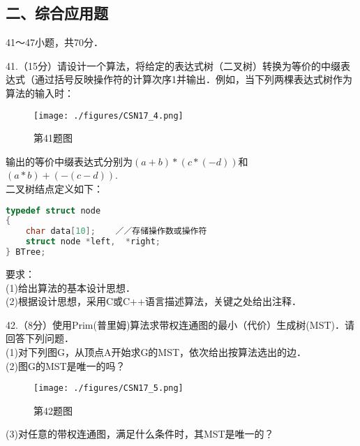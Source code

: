 \subsection{二、综合应用题}
41～47小题，共70分．

41.（15分）请设计一个算法，将给定的表达式树（二叉树）转换为等价的中缀表达式（通过括号反映操作符的计算次序1并输出．例如，当下列两棵表达式树作为算法的输入时：
\begin{figure}[ht]
\centering
\texttt{[image: ./figures/CSN17\_4.png]}
\caption{第41题图} \label{CSN17_fig4}
\end{figure}
输出的等价中缀表达式分别为$(a+b)*(c*(-d))$和$(a*b)+(-(c-d))$. \\
二叉树结点定义如下：
\begin{lstlisting}[language=cpp]
typedef struct node
{
    char data[10];    ／／存储操作数或操作符
    struct node *left,  *right;
} BTree;
\end{lstlisting}
要求： \\
(1)给出算法的基本设计思想． \\
(2)根据设计思想，采用C或C++语言描述算法，关键之处给出注释．

42.（8分）使用Prim(普里姆)算法求带权连通图的最小（代价）生成树(MST)．请回答下列问题． \\
(1)对下列图G，从顶点A开始求G的MST，依次给出按算法选出的边． \\
(2)图G的MST是唯一的吗？
\begin{figure}[ht]
\centering
\texttt{[image: ./figures/CSN17\_5.png]}
\caption{第42题图} \label{CSN17_fig5}
\end{figure}
(3)对任意的带权连通图，满足什么条件时，其MST是唯一的？